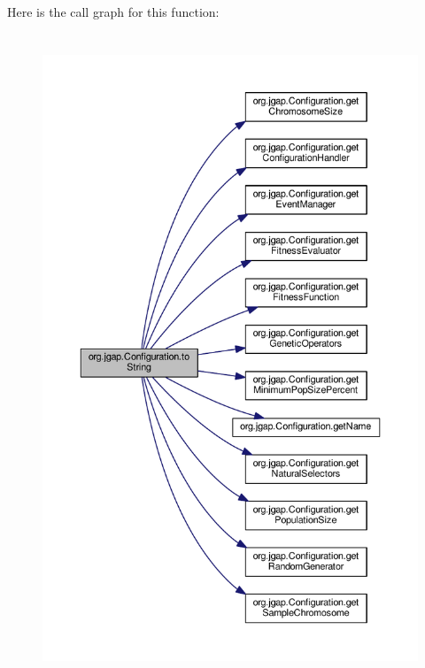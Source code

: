 Here is the call graph for this function\-:
\nopagebreak
\begin{figure}[H]
\begin{center}
\leavevmode
\includegraphics[height=550pt]{classorg_1_1jgap_1_1_configuration_ae2a41563013d4fafbe90a273f5e55e5b_cgraph}
\end{center}
\end{figure}


